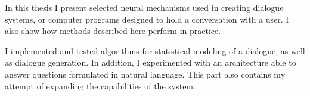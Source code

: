 
\noindent
In this thesis I present selected neural mechanisms used in creating dialogue systems, or computer programs designed to hold a conversation with a user. I also show how methods described here perform in practice.

I implemented and tested algorithms for statistical modeling of a dialogue, as well as dialogue generation. In addition, I experimented with an architecture able to answer questions formulated in natural language. This part also contains my attempt of expanding the capabilities of the system.